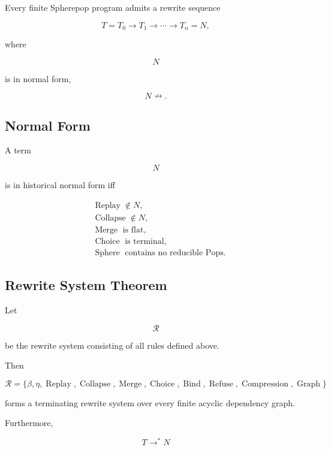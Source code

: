 \documentclass[12pt,oneside]{article}
\theoremstyle{definition}
\theoremstyle{remark}
\begin{document}
Every finite Spherepop program admits a rewrite sequence

\[
T
=
T_0
\rightarrow
T_1
\rightarrow
\cdots
\rightarrow
T_n
=
N,
\]

where

\[
N
\]

is in normal form,

\[
N
\nrightarrow.
\]

\subsection*{Normal Form}

A term

\[
N
\]

is in historical normal form iff

\[
\begin{aligned}
&
\operatorname{Replay}
\notin N,
\\
&
\operatorname{Collapse}
\notin N,
\\
&
\operatorname{Merge}
\text{ is flat},
\\
&
\operatorname{Choice}
\text{ is terminal},
\\
&
\operatorname{Sphere}
\text{ contains no reducible Pops}.
\end{aligned}
\]

\subsection*{Rewrite System Theorem}

Let

\[
\mathcal R
\]

be the rewrite system consisting of all rules defined above.

Then

\[
\boxed{
\mathcal R
=
\{
\beta,
\eta,
\operatorname{Replay},
\operatorname{Collapse},
\operatorname{Merge},
\operatorname{Choice},
\operatorname{Bind},
\operatorname{Refuse},
\operatorname{Compression},
\operatorname{Graph}
\}
}
\]

forms a terminating rewrite system over every finite acyclic dependency graph.

Furthermore,

\[
T
\rightarrow^{*}
N
\]
\end{document}
